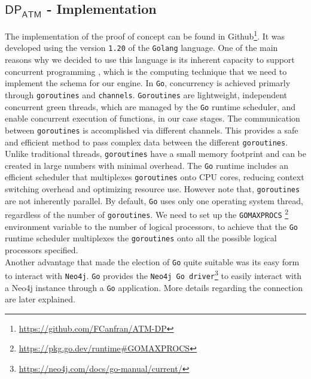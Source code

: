 \subsection*{$\mathsf{DP_{ATM}}$ - Implementation}\label{ContinuousQueryEngine-Implementation}

The implementation of the proof of concept can be found in Github\footnote{\url{https://github.com/FCanfran/ATM-DP}}. It was developed using the version \texttt{1.20} of the \texttt{Golang} language. 
One of the main reasons why we decided to use this language is its inherent capacity to support concurrent programming \cite{Go-cbtnuggets_concurrency, Go-medium_concurrency, Go-reliasoftware_concurrency}, which is the computing technique that we need to implement the \DP schema for our \DPATM engine. In \texttt{Go}, concurrency is achieved primarly through \texttt{goroutines} and \texttt{channels}. \texttt{Goroutines} are lightweight, independent concurrent green threads, which are managed by the \texttt{Go} runtime scheduler, and enable concurrent execution of functions, in our case stages. The communication between \texttt{goroutines} is accomplished via different channels. This provides a safe and efficient method to pass complex data between the different \texttt{goroutines}. 
Unlike traditional threads, \texttt{goroutines} have a small memory footprint and can be created in large numbers with minimal overhead. The \texttt{Go} runtime includes an efficient scheduler that multiplexes \texttt{goroutines} onto CPU cores, reducing context switching overhead and optimizing resource use. However note that, \texttt{goroutines} are not inherently parallel. By default, \texttt{Go} uses only one operating system thread, regardless of the number of \texttt{goroutines}. We need to set up the \texttt{GOMAXPROCS} \footnote{\url{https://pkg.go.dev/runtime\#GOMAXPROCS}} environment variable to the number of logical processors, to achieve that the \texttt{Go} runtime scheduler multiplexes the \texttt{goroutines} onto all the possible logical processors specified.\\

Another advantage that made the election of \texttt{Go} quite suitable was its easy form to interact with \texttt{Neo4j}. \texttt{Go} provides the \texttt{Neo4j Go driver}\footnote{\url{https://neo4j.com/docs/go-manual/current/}} to easily interact with a Neo4j instance through a \texttt{Go} application. More details regarding the connection are later explained. 

